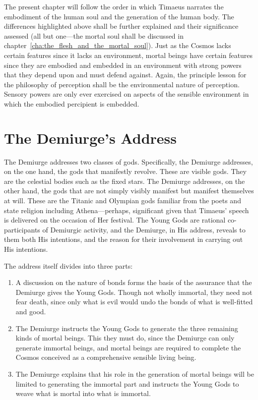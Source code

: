 The present chapter will follow the order in which Timaeus narrates the embodiment of the human soul and the generation of the human body. The differences highlighted above shall be further explained and their significance assessed (all but one---the mortal soul shall be discussed in chapter~\ref{cha:the_flesh_and_the_mortal_soul}). Just as the Cosmos lacks certain features since it lacks an environment, mortal beings have certain features since they are embodied and embedded in an environment with strong powers that they depend upon and must defend against. Again, the principle lesson for the philosophy of perception shall be the environmental nature of perception. Sensory powers are only ever exercised on aspects of the sensible environment in which the embodied percipient is embedded.


\section{The Demiurge's Address} %
\label{sec:the_demiurge_addressing_the_gods}

The Demiurge addresses two classes of gods. Specifically, the Demiurge addresses, on the one hand, the gods that manifestly revolve. These are visible gods. They are the celestial bodies such as the fixed stars. The Demiurge addresses, on the other hand, the gods that are not simply visibly manifest but manifest themselves at will. These are the Titanic and Olympian gods familiar from the poets and state religion including Athena---perhaps, significant given that Timaeus' speech is delivered on the occasion of Her festival. The Young Gods are rational co-participants of Demiurgic activity, and the Demiurge, in His address, reveals to them both His intentions, and the reason for their involvement in carrying out His intentions.

The address itself divides into three parts:
\begin{enumerate}[(1)]
	\item A discussion on the nature of bonds forms the basis of the assurance that the Demiurge gives the Young Gods. Though not wholly immortal, they need not fear death, since only what is evil would undo the bonds of what is well-fitted and good.
	\item The Demiurge instructs the Young Gods to generate the three remaining kinds of mortal beings. This they must do, since the Demiurge can only generate immortal beings, and mortal beings are required to complete the Cosmos conceived as a comprehensive sensible living being.
	\item The Demiurge explains that his role in the generation of mortal beings will be limited to generating the immortal part and instructs the Young Gods to weave what is mortal into what is immortal.
\end{enumerate}


